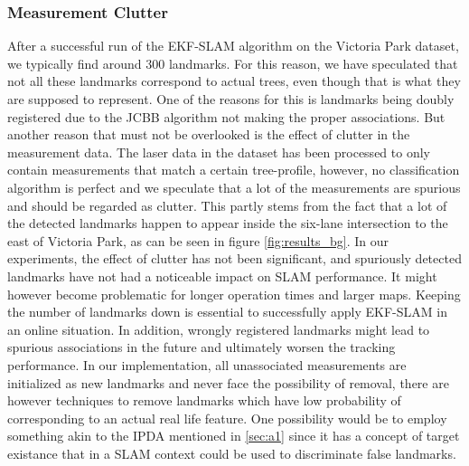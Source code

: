 \subsubsection{Measurement Clutter}
After a successful run of the EKF-SLAM algorithm on the Victoria Park dataset, we typically find around 300 landmarks. For this reason, we have speculated that not all these landmarks correspond to actual trees, even though that is what they are supposed to represent. One of the reasons for this is landmarks being doubly registered due to the JCBB algorithm not making the proper associations. But another reason that must not be overlooked is the effect of clutter in the measurement data. The laser data in the dataset has been processed to only contain measurements that match a certain tree-profile\cite{victoria}, however, no classification algorithm is perfect and we speculate that a lot of the measurements are spurious and should be regarded as clutter. This partly stems from the fact that a lot of the detected landmarks happen to appear inside the six-lane intersection to the east of Victoria Park, as can be seen in figure \ref{fig:results_bg}. In our experiments, the effect of clutter has not been significant, and spuriously detected landmarks have not had a noticeable impact on SLAM performance. It might however become problematic for longer operation times and larger maps. Keeping the number of landmarks down is essential to successfully apply EKF-SLAM in an online situation. In addition, wrongly registered landmarks might lead to spurious associations in the future and ultimately worsen the tracking performance. In our implementation, all unassociated measurements are initialized as new landmarks and never face the possibility of removal, there are however techniques to remove landmarks which have low probability of corresponding to an actual real life feature. One possibility would be to employ something akin to the IPDA mentioned in \ref{sec:a1} since it has a concept of target existance that in a SLAM context could be used to discriminate false landmarks.

